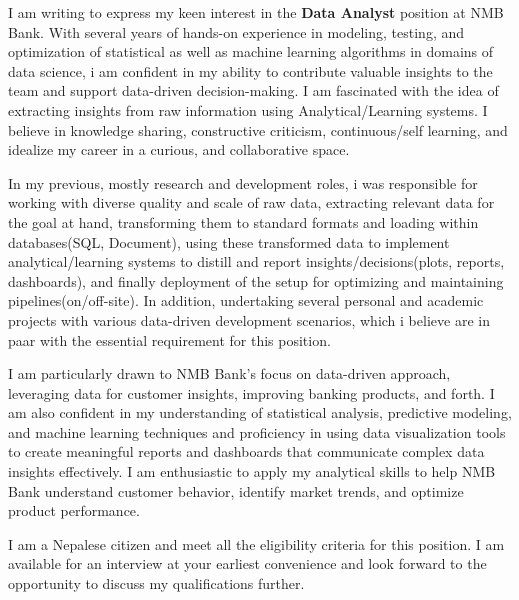 \documentclass[11pt,A4]{article}
\begin{document}
\vspace{10pt}

\vspace{10pt}

I am writing to express my keen interest in the \textbf{Data Analyst} position at NMB Bank. With several years
of hands-on experience in modeling, testing, and optimization of statistical as well as machine learning algorithms
in domains of data science, i am confident in my ability to contribute valuable insights to the team 
and support data-driven decision-making. I am fascinated with the idea of extracting insights from raw information
using Analytical/Learning systems. I believe in knowledge sharing, constructive criticism, 
continuous/self learning, and idealize my career in a curious, and collaborative space.
\vspace{15pt}



In my previous, mostly research and development roles, i was responsible for working with diverse quality and scale of raw data,
extracting relevant data for the goal at hand, transforming them to standard formats and loading within databases(SQL, Document),
using these transformed data to implement analytical/learning systems to distill and report insights/decisions(plots, reports, dashboards),
and finally deployment of the setup for optimizing and maintaining pipelines(on/off-site). In addition, undertaking several personal 
and academic projects with various data-driven development scenarios, which i believe are in paar with the essential requirement for this position. 
\vspace{15pt}



I am particularly drawn to NMB Bank's focus on data-driven approach, leveraging data for customer insights, improving banking products, and forth.
I am also confident in my understanding of statistical analysis, predictive modeling, and machine learning techniques and proficiency in 
using data visualization tools to create meaningful reports and dashboards that communicate complex data insights effectively. 
I am enthusiastic to apply my analytical skills to help NMB Bank understand customer behavior, identify market trends, and optimize product performance.

\vspace{15pt}
I am a Nepalese citizen and meet all the eligibility criteria for this position. I am available for an interview at your earliest convenience and 
look forward to the opportunity to discuss my qualifications further.
\end{document}
